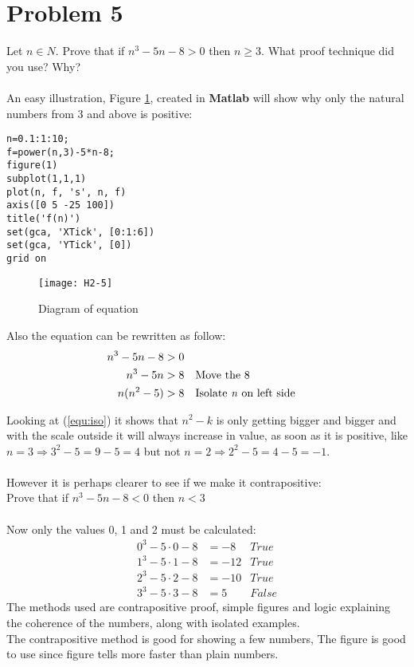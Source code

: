 \documentclass[english,10pt,a4paper]{article}
\begin{document}
\section*{Problem 5}
Let $n \in N$. Prove that if $n^3 - 5n - 8 > 0$ then $n \geq 3$. What proof technique did you use? Why?
\\
\\
An easy illustration, Figure \ref{fig:prob5}, created in \textbf{Matlab} will show why only the natural numbers from 3 and above is positive:

\begin{lstlisting}[caption=title, style=Code-Matlab, label=lst:ref]
n=0.1:1:10;
f=power(n,3)-5*n-8;
figure(1)
subplot(1,1,1)
plot(n, f, 's', n, f)
axis([0 5 -25 100])
title('f(n)')
set(gca, 'XTick', [0:1:6])
set(gca, 'YTick', [0])
grid on
\end{lstlisting}
\begin{figure}[hbtp]
\centering
\texttt{[image: H2-5]}
\caption{Diagram of equation}
\label{fig:prob5}
\end{figure}

Also the equation can be rewritten as follow:
\begin{align}
n^3-5n-8 &> 0 &\\
n^3-5n &> 8 & & \text{Move the }8\\
n(n^2-5) &> 8 & & \text{Isolate \textit{n} on left side} \label{equ:iso}
\end{align}

Looking at (\ref{equ:iso}) it shows that $n^2-k$ is only getting bigger and bigger and with the scale outside it will always increase in value, as soon as it is positive, like $n=3 \Rightarrow 3^2-5 = 9-5=4$ but not $n=2 \Rightarrow 2^2-5=4-5=-1$.
\\
\\
However it is perhaps clearer to see if we make it contrapositive:\\
Prove that if $n^3 - 5n - 8 < 0$ then $n < 3$\\
\\
Now only the values 0, 1 and 2 must be calculated:
\begin{align*}
0^3-5 \cdot 0 - 8 &= -8 & True\\
1^3-5\cdot 1-8 &= -12 & True\\
2^3-5\cdot 2-8 &= -10 & True\\
3^3-5\cdot 3-8 &= 5 & False
\end{align*}
The methods used are contrapositive proof, simple figures and logic explaining the coherence of the numbers, along with isolated examples.
\\
The contrapositive method is good for showing a few numbers,
The figure is good to use since figure tells more faster than plain numbers.
\end{document}
